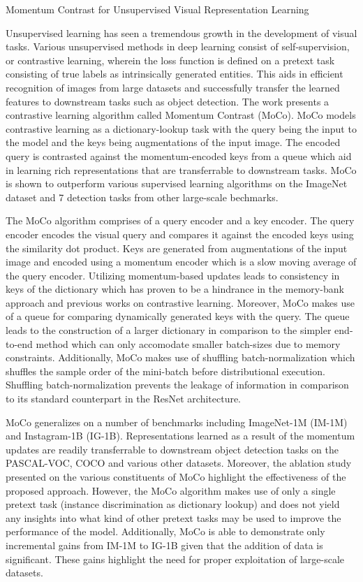 \documentclass[11pt,letterpaper]{article}
\begin{document}
\begin{center}
  \large{Momentum Contrast for Unsupervised Visual Representation Learning}
\end{center}

Unsupervised learning has seen a tremendous growth in the development of visual tasks. Various unsupervised methods in deep learning consist of self-supervision, or contrastive learning, wherein the loss function is defined on a pretext task consisting of true labels as intrinsically generated entities. This aids in efficient recognition of images from large datasets and successfully transfer the learned features to downstream tasks such as object detection. The work presents a contrastive learning algorithm called Momentum Contrast (MoCo). MoCo models contrastive learning as a dictionary-lookup task with the query being the input to the model and the keys being augmentations of the input image. The encoded query is contrasted against the momentum-encoded keys from a queue which aid in learning rich representations that are transferrable to downstream tasks. MoCo is shown to outperform various supervised learning algorithms on the ImageNet dataset and 7 detection tasks from other large-scale bechmarks.

The MoCo algorithm comprises of a query encoder and a key encoder. The query encoder encodes the visual query and compares it against the encoded keys using the similarity dot product. Keys are generated from augmentations of the input image and encoded using a momentum encoder which is a slow moving average of the query encoder. Utilizing momentum-based updates leads to consistency in keys of the dictionary which has proven to be a hindrance in the memory-bank approach and previous works on contrastive learning. Moreover, MoCo makes use of a queue for comparing dynamically generated keys with the query. The queue leads to the construction of a larger dictionary in comparison to the simpler end-to-end method which can only accomodate smaller batch-sizes due to memory constraints. Additionally, MoCo makes use of shuffling batch-normalization which shuffles the sample order of the mini-batch before distributional execution. Shuffling batch-normalization prevents the leakage of information in comparison to its standard counterpart in the ResNet architecture.  

MoCo generalizes on a number of benchmarks including ImageNet-1M (IM-1M) and Instagram-1B (IG-1B). Representations learned as a result of the momentum updates are readily transferrable to downstream object detection tasks on the PASCAL-VOC, COCO and various other datasets. Moreover, the ablation study presented on the various constituents of MoCo highlight the effectiveness of the proposed approach. However, the MoCo algorithm makes use of only a single pretext task (instance discrimination as dictionary lookup) and does not yield any insights into what kind of other pretext tasks may be used to improve the performance of the model. Additionally, MoCo is able to demonstrate only incremental gains from IM-1M to IG-1B given that the addition of data is significant. These gains highlight the need for proper exploitation of large-scale datasets.
\end{document}
